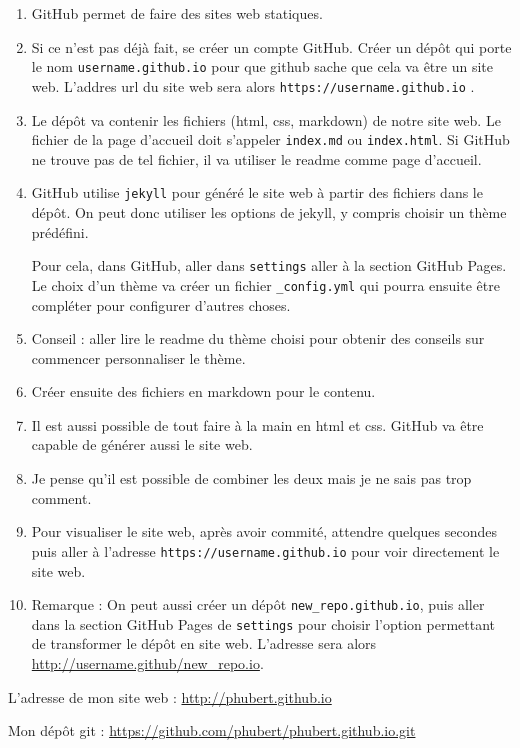 \documentclass[letter,12pt]{article}
\begin{document}
	\begin{enumerate}
		\item GitHub permet de faire des sites web statiques. 
		
		\item Si ce n'est pas déjà fait, se créer un compte GitHub. Créer un dépôt qui porte le nom \texttt{username.github.io} pour que github sache que cela va être un site web. L'addres url du site web sera alors \texttt{https://username.github.io} .
		
		\item Le dépôt va contenir les fichiers (html, css, markdown) de notre site web. Le fichier de la page d'accueil doit s'appeler \texttt{index.md} ou \texttt{index.html}. Si GitHub ne trouve pas de tel fichier, il va utiliser le readme comme page d'accueil. 
		
		\item GitHub utilise \texttt{jekyll} pour généré le site web à partir des fichiers dans le dépôt. On peut donc utiliser les options de jekyll, y compris choisir un thème prédéfini. 
		
		Pour cela, dans GitHub, aller dans \texttt{settings} aller à la section GitHub Pages. Le choix d'un thème va créer un fichier \texttt{\_config.yml} qui pourra ensuite être compléter pour configurer d'autres choses. 
		
		\item Conseil : aller lire le readme du thème choisi pour obtenir des conseils sur commencer personnaliser le thème. 
		
		\item Créer ensuite des fichiers en markdown pour le contenu.
		
		\item Il est aussi possible de tout faire à la main en html et css. GitHub va être capable de générer aussi le site web. 
		
		\item Je pense qu'il est possible de combiner les deux mais je ne sais pas trop comment. 
		
		\item Pour visualiser le site web, après avoir commité, attendre quelques secondes puis aller à l'adresse \texttt{https://username.github.io} pour voir directement le site web. 
		
		\item Remarque : On peut aussi créer un dépôt  \texttt{new\_repo.github.io}, puis aller dans la section GitHub Pages de \texttt{settings} pour choisir l'option permettant de transformer le dépôt en site web. L'adresse sera alors \url{http://username.github/new\_repo.io}. 
	\end{enumerate}

	L'adresse de mon site web : \url{http://phubert.github.io}
	
	Mon dépôt git : \url{https://github.com/phubert/phubert.github.io.git}
\end{document}
